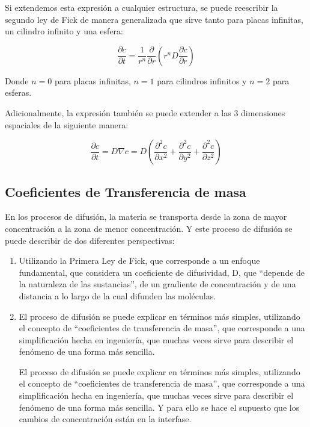 \documentclass[11pt]{book}
\begin{document}
Si extendemos esta expresión a cualquier estructura, se puede reescribir la segundo ley de Fick de manera generalizada que sirve tanto para placas infinitas, un cilindro infinito y una esfera:

\begin{equation}
    \label{eq:Absorcion_9}
    \frac{\partial c}{\partial t} = \frac{1}{r^n} \frac{\partial}{\partial r} \left( r^n D \frac{\partial c}{\partial r}\right)
\end{equation}

Donde $n=0$ para placas infinitas, $n=1$ para cilindros infinitos y $n=2$ para esferas. 

Adicionalmente, la expresión también se puede extender a las 3 dimensiones espaciales de la siguiente manera:

\begin{equation}
    \label{eq:Absorcion_10}
    \frac{\partial c}{\partial t}  = D \nabla c = D \left( \frac{\partial^2 c}{\partial x^2} + \frac{\partial^2 c}{\partial y^2} + \frac{\partial^2 c}{\partial z^2}\right)
\end{equation}

\subsection{Coeficientes de Transferencia de masa}

En los procesos de difusión, la materia se transporta desde la zona de mayor concentración a la zona de menor concentración. Y este proceso de difusión se puede describir de dos diferentes perspectivas:

\begin{enumerate}
    \item Utilizando la Primera Ley de Fick, que corresponde a un enfoque fundamental, que  considera un coeficiente de difusividad, D, que “depende de  la naturaleza de las sustancias”, de un gradiente de  concentración y de una distancia a lo largo de la cual difunden las moléculas.
    
    \item El proceso de difusión se puede explicar en términos más simples, utilizando el concepto de “coeficientes de transferencia de masa”, que corresponde a una simplificación hecha en ingeniería, que muchas veces sirve para describir el fenómeno de una forma más sencilla.
    
    El proceso de difusión se puede explicar en términos más simples, utilizando el concepto de “coeficientes de transferencia de masa”, que corresponde a una simplificación hecha en ingeniería, que muchas veces sirve para describir el fenómeno de una forma más sencilla. Y para ello se hace el supuesto que los cambios de concentración están en la interfase.
\end{enumerate}
\end{document}
